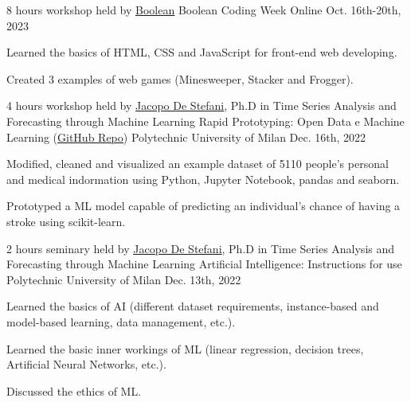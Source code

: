 \begin{cventries}
  \cventry
    {8 hours workshop held by \underline{\href{https://boolean.careers/}{Boolean}}} %
    {Boolean Coding Week} %
    {Online} %
    {Oct. 16th-20th, 2023} %
    {
      \begin{cvitems} %
        \item {Learned the basics of HTML, CSS and JavaScript for front-end web developing.}
        \item {Created 3 examples of web games (Minesweeper, Stacker and Frogger).}
      \end{cvitems}
    }

  \cventry
    {4 hours workshop held by \underline{\href{https://www.linkedin.com/in/jdestefani/}{Jacopo De Stefani}}, Ph.D in Time Series Analysis and Forecasting through Machine Learning} %
    {Rapid Prototyping: Open Data e Machine Learning (\underline{\href{https://github.com/jdestefani/rapidprototyping-opendata-ml}{GitHub Repo}})} %
    {Polytechnic University of Milan} %
    {Dec. 16th, 2022} %
    {
      \begin{cvitems} %
        \item {Modified, cleaned and visualized an example dataset of 5110 people's personal and medical indormation using Python, Jupyter Notebook, pandas and seaborn.}
        \item {Prototyped a ML model capable of predicting an individual's chance of having a stroke using scikit-learn.}
      \end{cvitems}
    }

  \cventry
    {2 hours seminary held by \underline{\href{https://www.linkedin.com/in/jdestefani/}{Jacopo De Stefani}}, Ph.D in Time Series Analysis and Forecasting through Machine Learning} %
    {Artificial Intelligence: Instructions for use} %
    {Polytechnic University of Milan} %
    {Dec. 13th, 2022} %
    {
      \begin{cvitems} %
        \item {Learned the basics of AI (different dataset requirements, instance-based and model-based learning, data management, etc.).}
        \item {Learned the basic inner workings of ML (linear regression, decision trees, Artificial Neural Networks, etc.).}
        \item {Discussed the ethics of ML.}
      \end{cvitems}
    }


\end{cventries}
